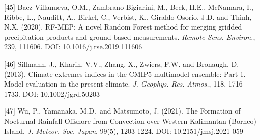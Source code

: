 \documentclass[
]{article}
\begin{document}
{[}45{]} Baez-Villanueva, O.M., Zambrano-Bigiarini, M., Beck, H.E.,
McNamara, I., Ribbe, L., Nauditt, A., Birkel, C., Verbist, K.,
Giraldo-Osorio, J.D. and Thinh, N.X. (2020). RF-MEP: A novel Random
Forest method for merging gridded precipitation products and
ground-based measurements. \emph{Remote Sens. Environ.}, 239, 111606.
DOI: 10.1016/j.rse.2019.111606

{[}46{]} Sillmann, J., Kharin, V.V., Zhang, X., Zwiers, F.W. and
Bronaugh, D. (2013). Climate extremes indices in the CMIP5 multimodel
ensemble: Part 1. Model evaluation in the present climate. \emph{J.
Geophys. Res. Atmos.}, 118, 1716-1733. DOI: 10.1002/jgrd.50203

{[}47{]} Wu, P., Yamanaka, M.D.~and Matsumoto, J. (2021). The Formation
of Nocturnal Rainfall Offshore from Convection over Western Kalimantan
(Borneo) Island. \emph{J. Meteor. Soc. Japan}, 99(5), 1203-1224. DOI:
10.2151/jmsj.2021-059
\end{document}
